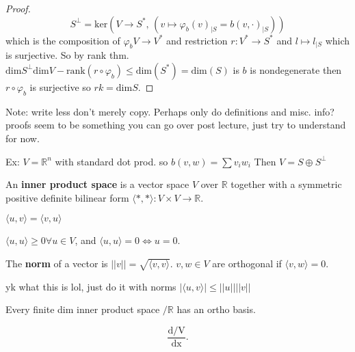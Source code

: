 \documentclass{report}
\begin{document}
\begin{proof}
  
  \begin{displaymath}
    S^{\perp}=      \text{ker} \left( V \to  S^*, \, (v \mapsto \varphi _b(v)_{\mid S} =b(v,\cdot)_{\mid S}) \right)
  \end{displaymath}
  which is the composition of \( \varphi _b V \to  V^* \) and restriction \( r: V^* \to  S^* \) and \( l\mapsto l_{\mid S} \) which is surjective. So by rank thm. \( \text{dim}S^{\perp} \text{dim}V-\text{rank}(r \circ \varphi _b ) \le \text{dim}(S^*)=\text{dim}(S) \) is \( b  \) is nondegenerate then \( r \circ \varphi _b \) is surjective so \( rk=\text{dim}S \).
\end{proof}


Note: write less don't merely copy. Perhaps only do definitions and misc. info? proofs seem to be something you can go over post lecture, just try to understand for now. 


Ex: \( V=\mathbb{R}^n \) with standard dot prod. so \( b(v,w) = \sum v_i w_i \) Then \( V= S \oplus S^\perp \)


\begin{definition}
  An \textbf{inner product space} is a vector space \( V \) over \( \mathbb{R} \) together with a symmetric positive definite bilinear form \( \langle *,*\rangle: V \times V \to  \mathbb{R} \).
\end{definition}

\begin{definition}
  \( \langle u,v \rangle =\langle v,u \rangle \)
\end{definition}

\begin{definition}
  \( \langle u,u \rangle \ge  0 \forall u \in  V \), and \( \langle u,u \rangle=0 \iff u=0 \).
\end{definition}

\begin{definition}[norm]
  The \textbf{norm} of a vector is \( | | v | | = \sqrt{\langle v,v\rangle}  \). \(v,w \in V \) are orthogonal if \( \langle v,w \rangle =0 \). 
\end{definition}

\begin{theorem}
  yk what this is lol, just do it with norms \( |\langle u , v \rangle | \le | | u | | | | v | | \)
\end{theorem}

\begin{theorem}
  Every finite dim inner product space \( / \mathbb{R} \) has an ortho basis.
\end{theorem}

\[
  \frac{\mathrm{d/V}}{\mathrm{dx}} 
.\] 
\end{document}
